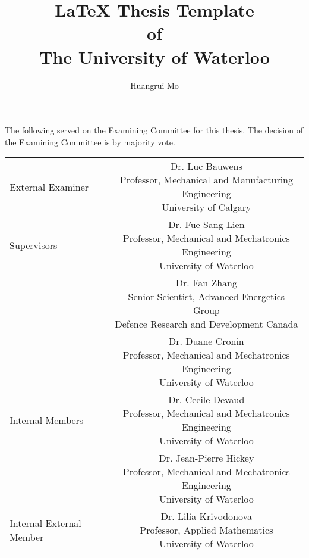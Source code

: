 \title[\LaTeX{} Thesis Template of UW]{\LaTeX{} Thesis Template\\ of\\ The University of Waterloo}%
\author{Huangrui Mo}
\maketitle
\begin{committee}
    \noindent
    The following served on the Examining Committee for this thesis. The decision of the Examining Committee is by majority vote.

    \begin{center}
        \setlength{\tabcolsep}{10pt}%
        \renewcommand{\arraystretch}{3}%
        \begin{tabular}{lc}
            External Examiner & \parbox[t]{10cm}{Dr. Luc Bauwens\\Professor, Mechanical and Manufacturing Engineering\\University of 
Calgary}\\
            Supervisors & \parbox[t]{10cm}{Dr. Fue-Sang Lien\\Professor, Mechanical and Mechatronics Engineering\\University of Waterloo}\\
             & \parbox[t]{10cm}{Dr. Fan Zhang\\Senior Scientist, Advanced Energetics Group\\Defence Research and Development Canada}\\
             & \parbox[t]{10cm}{Dr. Duane Cronin\\Professor, Mechanical and Mechatronics Engineering\\University of Waterloo}\\
            Internal Members & \parbox[t]{10cm}{Dr. Cecile Devaud\\Professor, Mechanical and Mechatronics Engineering\\University of Waterloo}\\
             & \parbox[t]{10cm}{Dr. Jean-Pierre Hickey\\Professor, Mechanical and Mechatronics Engineering\\University of Waterloo}\\
            Internal-External Member & \parbox[t]{10cm}{Dr. Lilia Krivodonova\\Professor, Applied Mathematics\\University of Waterloo}\\
        \end{tabular}
    \end{center}
\end{committee}
